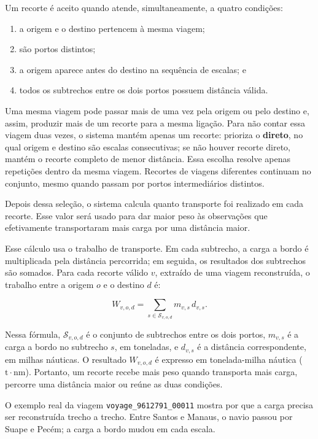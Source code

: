\documentclass[brazil,]{article}
\begin{document}
Um recorte é aceito quando atende, simultaneamente, a quatro condições:

\begin{enumerate}
\def\labelenumi{\arabic{enumi}.}
\item
  a origem e o destino pertencem à mesma viagem;
\item
  são portos distintos;
\item
  a origem aparece antes do destino na sequência de escalas; e
\item
  todos os subtrechos entre os dois portos possuem distância válida.
\end{enumerate}

Uma mesma viagem pode passar mais de uma vez pela origem ou pelo destino
e, assim, produzir mais de um recorte para a mesma ligação. Para não
contar essa viagem duas vezes, o sistema mantém apenas um recorte:
prioriza o \textbf{direto}, no qual origem e destino são escalas
consecutivas; se não houver recorte direto, mantém o recorte completo de
menor distância. Essa escolha resolve apenas repetições dentro da mesma
viagem. Recortes de viagens diferentes continuam no conjunto, mesmo
quando passam por portos intermediários distintos.

Depois dessa seleção, o sistema calcula quanto transporte foi realizado
em cada recorte. Esse valor será usado para dar maior peso às observações
que efetivamente transportaram mais carga por uma distância maior.

Esse cálculo usa o trabalho de transporte. Em cada subtrecho, a carga a
bordo é multiplicada pela distância percorrida; em seguida, os
resultados dos subtrechos são somados. Para cada recorte válido \(v\),
extraído de uma viagem reconstruída, o trabalho entre a origem \(o\) e o
destino \(d\) é:

\[
W_{v,o,d}=\sum_{s\in\mathcal{S}_{v,o,d}}m_{v,s}\,d_{v,s}.
\]

Nessa fórmula, \(\mathcal{S}_{v,o,d}\) é o conjunto de subtrechos entre
os dois portos, \(m_{v,s}\) é a carga a bordo no subtrecho \(s\), em
toneladas, e \(d_{v,s}\) é a distância correspondente, em milhas
náuticas. O resultado \(W_{v,o,d}\) é expresso em tonelada-milha náutica
(\(\mathrm{t\cdot nm}\)). Portanto, um recorte recebe mais peso quando
transporta mais carga, percorre uma distância maior ou reúne as duas
condições.

O exemplo real da viagem \texttt{voyage\_9612791\_00011} mostra por que
a carga precisa ser reconstruída trecho a trecho. Entre Santos e Manaus,
o navio passou por Suape e Pecém; a carga a bordo mudou em cada escala.
\end{document}
